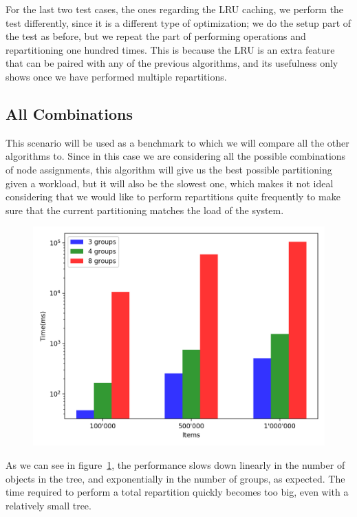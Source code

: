 For the last two test cases, the ones regarding the LRU caching, we perform the test differently, since it is a different type of optimization; we do the setup part of the test as before, but we repeat the part of performing operations and repartitioning one hundred times. This is because the LRU is an extra feature that can be paired with any of the previous algorithms, and its usefulness only shows once we have performed multiple repartitions.

\subsection{All Combinations}\label{sec:all-combinations}
This scenario will be used as a benchmark to which we will compare all the other algorithms to. Since in this case we are considering all the possible combinations of node assignments, this algorithm will give us the best possible partitioning given a workload, but it will also be the slowest one, which makes it not ideal considering that we would like to perform repartitions quite frequently to make sure that the current partitioning matches the load of the system.

\begin{figure}[!htb]
  \centering
  \includegraphics[width=\textwidth,height=\textheight,keepaspectratio]{img/all.png}
  \caption[caption]{ }
  \label{fig:all}
\end{figure}

As we can see in figure~\ref{fig:all}, the performance slows down linearly in the number of objects in the tree, and exponentially in the number of groups, as expected. The time required to perform a total repartition quickly becomes too big, even with a relatively small tree.

